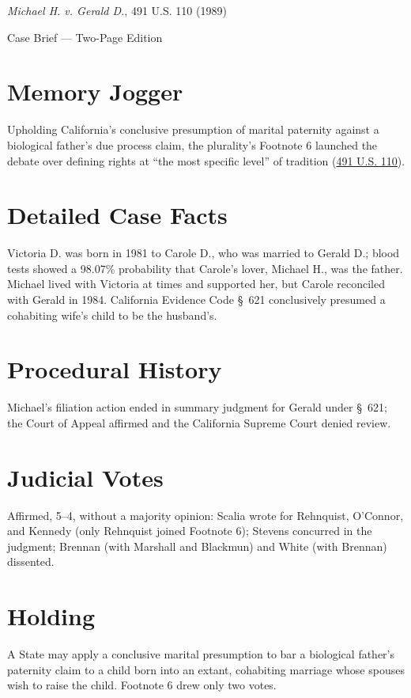 \documentclass[12pt]{article}
\begin{document}
\begin{center}
{\LARGE \textit{Michael H. v. Gerald D.}, 491 U.S. 110 (1989)\par}
\vspace{0.5em}
{\large Case Brief --- Two-Page Edition\par}
\end{center}

\section{Memory Jogger}
Upholding California's conclusive presumption of marital paternity against a biological father's due process claim, the plurality's Footnote 6 launched the debate over defining rights at ``the most specific level'' of tradition (\href{https://supreme.justia.com/cases/federal/us/491/110/}{491 U.S. 110}).

\section{Detailed Case Facts}
Victoria D. was born in 1981 to Carole D., who was married to Gerald D.; blood tests showed a 98.07\% probability that Carole's lover, Michael H., was the father. Michael lived with Victoria at times and supported her, but Carole reconciled with Gerald in 1984. California Evidence Code \S~621 conclusively presumed a cohabiting wife's child to be the husband's.

\section{Procedural History}
Michael's filiation action ended in summary judgment for Gerald under \S~621; the Court of Appeal affirmed and the California Supreme Court denied review.

\section{Judicial Votes}
Affirmed, 5--4, without a majority opinion: Scalia wrote for Rehnquist, O'Connor, and Kennedy (only Rehnquist joined Footnote 6); Stevens concurred in the judgment; Brennan (with Marshall and Blackmun) and White (with Brennan) dissented.

\section{Holding}
A State may apply a conclusive marital presumption to bar a biological father's paternity claim to a child born into an extant, cohabiting marriage whose spouses wish to raise the child. Footnote 6 drew only two votes.
\end{document}
